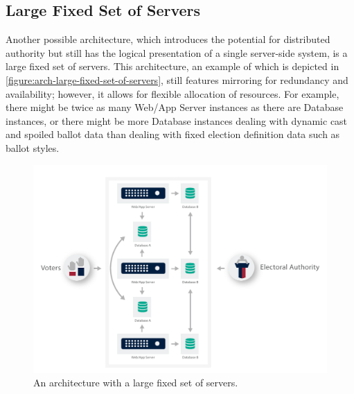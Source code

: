 \subsection{Large Fixed Set of Servers}

Another possible architecture, which introduces the potential for
distributed authority but still has the logical presentation of a
single server-side system, is a large fixed set of servers. This
architecture, an example of which is depicted in
\autoref{figure:arch-large-fixed-set-of-servers}, still features
mirroring for redundancy and availability; however, it allows for
flexible allocation of resources. For example, there might be twice as
many Web/App Server instances as there are Database instances, or
there might be more Database instances dealing with dynamic cast and
spoiled ballot data than dealing with fixed election definition data
such as ballot styles.

\begin{figure}[p]
\begin{center}
\includegraphics[width=5.5in]{architecture_resources/large-fixed-set-of-servers.pdf}
\end{center}
\vspace*{-3ex}
\caption{An architecture with a large fixed set of servers.}
\label{figure:arch-large-fixed-set-of-servers}
\end{figure}

